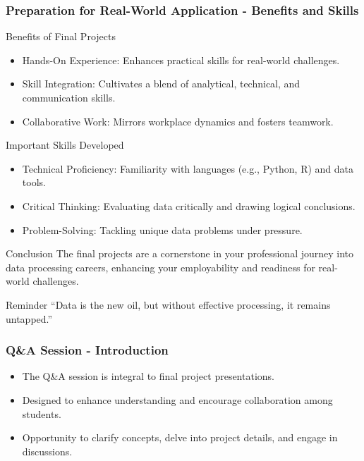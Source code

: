 \documentclass[aspectratio=169]{beamer}
\begin{document}
\begin{frame}[fragile]
    \frametitle{Preparation for Real-World Application - Benefits and Skills}
    \begin{block}{Benefits of Final Projects}
        \begin{itemize}
            \item Hands-On Experience: Enhances practical skills for real-world challenges.
            \item Skill Integration: Cultivates a blend of analytical, technical, and communication skills.
            \item Collaborative Work: Mirrors workplace dynamics and fosters teamwork.
        \end{itemize}
    \end{block}

    \begin{block}{Important Skills Developed}
        \begin{itemize}
            \item Technical Proficiency: Familiarity with languages (e.g., Python, R) and data tools.
            \item Critical Thinking: Evaluating data critically and drawing logical conclusions.
            \item Problem-Solving: Tackling unique data problems under pressure.
        \end{itemize}
    \end{block}

    \begin{block}{Conclusion}
        The final projects are a cornerstone in your professional journey into data processing careers, enhancing your employability and readiness for real-world challenges.
    \end{block}
    
    \begin{block}{Reminder}
        ``Data is the new oil, but without effective processing, it remains untapped.''
    \end{block}
\end{frame}

\begin{frame}[fragile]
    \frametitle{Q\&A Session - Introduction}
    \begin{itemize}
        \item The Q\&A session is integral to final project presentations.
        \item Designed to enhance understanding and encourage collaboration among students.
        \item Opportunity to clarify concepts, delve into project details, and engage in discussions.
    \end{itemize}
\end{frame}
\end{document}

